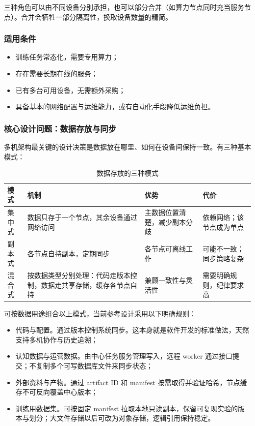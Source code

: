 \documentclass[11pt,a4paper]{article}
\begin{document}
三种角色可以由不同设备分别承担，也可以部分合并（如算力节点同时充当服务节点）。合并会牺牲一部分隔离性，换取设备数量的精简。

\subsubsection{适用条件}

\begin{itemize}[leftmargin=2em,itemsep=2pt]
  \item 训练任务常态化，需要专用算力；
  \item 存在需要长期在线的服务；
  \item 已有多台可用设备，无需额外采购；
  \item 具备基本的网络配置与运维能力，或有自动化手段降低运维负担。
\end{itemize}

\subsubsection{核心设计问题：数据存放与同步}

多机架构最关键的设计决策是数据放在哪里、如何在设备间保持一致。有三种基本模式：

\begin{table}[H]
\centering
\renewcommand{\arraystretch}{1.4}
\begin{tabularx}{\textwidth}{P{2.2cm} P{3.8cm} P{3.2cm} L}
\toprule
\textbf{模式} & \textbf{机制} & \textbf{优势} & \textbf{代价} \\
\midrule
集中式 & 数据只存于一个节点，其余设备通过网络访问 & 主数据位置清楚，减少副本分歧 & 依赖网络；该节点成为单点 \\
副本式 & 各节点自持副本，定期同步 & 各节点可离线工作 & 可能不一致；同步策略复杂 \\
混合式 & 按数据类型分别处理：代码走版本控制，数据走共享存储，缓存各节点自持 & 兼顾一致性与灵活性 & 需要明确规则，纪律要求高 \\
\bottomrule
\end{tabularx}
\caption{数据存放的三种模式}
\end{table}

可按数据用途组合以上模式，当前参考设计采用以下明确规则：

\begin{itemize}[leftmargin=2em,itemsep=2pt]
  \item 代码与配置。通过版本控制系统同步。这本身就是软件开发的标准做法，天然支持多机协作与历史追溯；
  \item 认知数据与运营数据。由中心任务服务管理写入，远程 worker 通过接口提交；不复制多个可写数据库文件来同步状态；
  \item 外部资料与产物。通过 artifact ID 和 manifest 按需取得并验证哈希，节点缓存不可反向覆盖中心版本；
  \item 训练用数据集。可按固定 manifest 拉取本地只读副本，保留可复现实验的版本与划分；大文件存储以后可改为对象存储，逻辑引用保持稳定。
\end{itemize}
\end{document}
